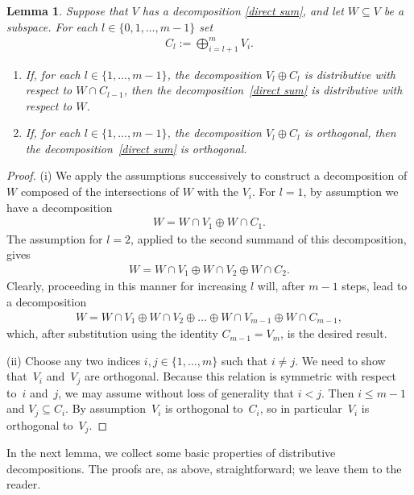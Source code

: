 \documentclass[10pt,a4paper]{amsart}
\numberwithin{equation}{section}
\newtheorem{Lemma}[Theorem]{Lemma}
\begin{document}
\begin{Lemma}\label{distributive filter}
Suppose that  $V$ has a decomposition \eqref{direct sum}, and let $W \subseteq V$ be a subspace.
For each $l \in \{0,1,\dots ,m-1\}$ set
\begin{gather*}
C_l := \bigoplus_{i=l+1}^m V_i.
\end{gather*}
\begin{enumerate}[{\rm (i)}]\itemsep=0pt
\item If, for each $l \in \{1,\dots ,m-1\}$, the decomposition $V_l \oplus C_{l}$ is distributive with respect to $W \cap C_{l-1}$, then the decomposition~\eqref{direct sum} is distributive with respect to $W$.
\item If, for each $l \in \{1,\dots ,m-1\}$, the decomposition $V_l \oplus C_{l}$ is orthogonal, then the decomposition~\eqref{direct sum} is orthogonal.
\end{enumerate}
\end{Lemma}

\begin{proof}
(i) We apply the assumptions successively to construct a decomposition of $W$ composed of the intersections of $W$ with the $V_i$. For $l=1$, by assumption we have a decomposition
\begin{gather*}
W = W \cap V_1 \oplus W \cap C_1.
\end{gather*}
The assumption for $l=2$, applied to the second summand of this decomposition, gives
\begin{gather*}
W = W \cap V_1 \oplus W \cap V_2 \oplus W \cap C_2.
\end{gather*}
Clearly, proceeding in this manner for increasing $l$ will, after $m-1$ steps, lead to a decomposition
\begin{gather*}
W = W \cap V_1 \oplus W \cap V_2 \oplus  \dots  \oplus W \cap V_{m-1} \oplus W \cap C_{m-1},
\end{gather*}
which, after substitution using the identity $C_{m-1} = V_m$, is the desired result.

(ii) Choose any two indices $i, j \in \{1,\dots ,m\}$ such that $i \neq j$. We need to show that~$V_i$ and~$V_j$ are orthogonal. Because this relation is symmetric with respect to~$i$ and~$j$, we may assume without loss of generality that $i < j$. Then $i \leq m-1$ and $V_j \subseteq C_i$. By assumption~$V_i$ is orthogonal to~$C_i$, so in particular~$V_i$ is orthogonal to~$V_j$.
\end{proof}

In the next lemma, we collect some basic properties of distributive decompositions. The proofs are, as above, straightforward; we leave them to the reader.
\end{document}
